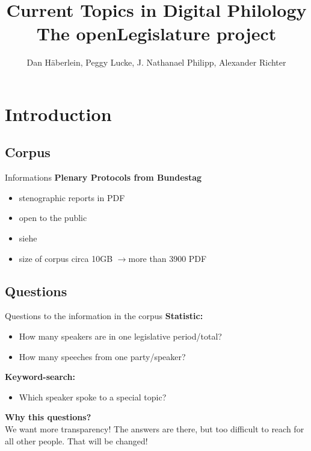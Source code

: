 \documentclass[11pt, a4paper]{beamer}
\author{Dan Häberlein, Peggy Lucke, J. Nathanael Philipp, Alexander Richter}
\title[The openLegislature project]{Current Topics in Digital Philology\\The openLegislature project}
\date{}
\institute{Universität Leipzig}
\begin{document}
\section{}
\begin{frame}
\titlepage
\end{frame}

 {
}


\section{Introduction}
\subsection{Corpus}
\begin{frame}{Informations}
\textbf{Plenary Protocols from Bundestag}
\begin{itemize}
\item stenographic reports in PDF
\item open to the public
\item siehe \cite{bundestag} \\[1em]
\item size of corpus circa 10GB $\rightarrow$more than 3900 PDF 
\end{itemize}
\end{frame}

\subsection{Questions}
\begin{frame}{Questions to the information in the corpus}
\textbf{Statistic:}
\begin{itemize}
\item How many speakers are in one legislative period/total?
\item How many speeches from one party/speaker?
\end{itemize}
\textbf{Keyword-search:}
\begin{itemize}
\item Which speaker spoke to a special topic?
\end{itemize}
\textbf{Why this questions?}\\
We want more transparency! The answers are there, but too difficult to reach for all other people. That will be changed!
\end{frame}
\end{document}
